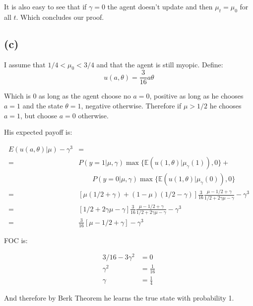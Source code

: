 \documentclass{article}
\begin{document}
It is also easy to see that if $\gamma = 0$ the agent doesn't update and then $\mu_t = \mu_0$
for all $t$. Which concludes our proof.


\subsection{(c)} %

I assume that $1/4 < \mu_0 < 3/4$ and that the agent is still myopic. 
Define:
\begin{equation}
  u(a,\theta) = \frac{3}{16}a\theta
\end{equation}

Which is $0$ as long as the agent choose no $a = 0$, positive as long as he chooses $a = 1$
and the state $\theta = 1$, negative otherwise. Therefore if $\mu > 1/2$ he chooses $a = 1$,
but choose $a = 0$ otherwise.

His expected payoff is:

\begin{equation}
\begin{split}
  E(u(a,\theta) | \mu) - \gamma^3 & = \\
  = & P(y = 1 |\mu, \gamma)\max\{\mathbb{E}(u(1,\theta) | \mu_\gamma(1)), 0\} + \\
    &\qquad P(y = 0 |\mu, \gamma)\max\{\mathbb{E}(u(1,\theta) | \mu_\gamma(0)), 0\} \\
  = & [\mu(1/2 + \gamma) + (1 - \mu)(1/2 -\gamma)] \frac{3}{16}
      \frac{\mu - 1/2 + \gamma}{1/2 + 2\gamma\mu - \gamma} - \gamma^3  \\
  = & [1/2 + 2\gamma\mu - \gamma] \frac{3}{16}\frac{\mu - 1/2 + \gamma}{1/2 + 2\gamma\mu - \gamma} - \gamma^3 \\
  = & \frac{3}{16}[\mu - 1/2 + \gamma] - \gamma^3
\end{split}
\end{equation}

FOC is:
  
\begin{equation}
\begin{split}
  3/16 - 3\gamma^2  & = 0 \\
  \gamma^2          & = \frac{1}{16} \\
  \gamma            & = \frac{1}{4}
\end{split}
\end{equation}

And therefore by Berk Theorem he learns the true state with probability 1.
\end{document}
